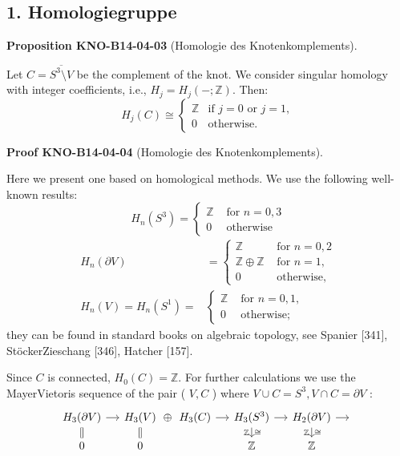 \documentclass[10pt, letterpaper]{article}
\newcommand{\CustomHeading}[3]{%
  \par\medskip\noindent%
  \textbf{#1 #2} \textnormal{(#3)}.\enskip%
}
\newenvironment{PROP}[2]{\CustomHeading{Proposition}{#1}{#2}}{}
\newenvironment{PROOF}[2]{\CustomHeading{Proof}{#1}{#2}}{}
\begin{document}
\subsection{1. Homologiegruppe}

\begin{PROP}{KNO-B14-04-03}{Homologie des Knotenkomplements}
Let \( C = \overline{S^3 \setminus V} \) be the complement of the knot. We consider singular homology with integer coefficients, i.e., \( H_j = H_j(-; \mathbb{Z}) \). Then:
\[
H_j(C) \cong
\begin{cases}
\mathbb{Z} & \text{if } j = 0 \text{ or } j = 1, \\
0 & \text{otherwise}.
\end{cases}
\]
\end{PROP}

\begin{PROOF}{KNO-B14-04-04}{Homologie des Knotenkomplements}
Here we present one based on homological methods. We use the following well-known results:
$$
H_{n}\left(S^{3}\right)= \begin{cases}\mathbb{Z} & \text { for } n=0,3 \\ 0 & \text { otherwise }\end{cases}
$$
$$
\begin{aligned}
H_{n}(\partial V) & = \begin{cases}\mathbb{Z} & \text { for } n=0,2 \\
\mathbb{Z} \oplus \mathbb{Z} & \text { for } n=1, \\
0 & \text { otherwise, }\end{cases} \\
H_{n}(V)=H_{n}\left(S^{1}\right)= & \begin{cases}\mathbb{Z} & \text { for } n=0,1, \\
0 & \text { otherwise; }\end{cases}
\end{aligned}
$$
they can be found in standard books on algebraic topology, see Spanier [341], StöckerZieschang [346], Hatcher [157].

Since $C$ is connected, $H_{0}(C)=\mathbb{Z}$. For further calculations we use the MayerVietoris sequence of the pair ( $V, C$ ) where $V \cup C=S^{3}, V \cap C=\partial V$ :
\[
\begin{tikzcd}[row sep=small, column sep=small]
H_3(\partial V) \arrow[r] \arrow[d, equal] 
  & H_3(V) \arrow[r, phantom, "\oplus"] \arrow[d, equal] 
  & H_3(C) \arrow[r] 
  & H_3(S^3) \arrow[r] \arrow[d, "\cong", "\mathbb{Z}"']
  & H_2(\partial V) \arrow[r] \arrow[d, "\cong", "\mathbb{Z}"'] 
  & {} \\
0 & 0 & {} & \mathbb{Z} & \mathbb{Z} & {}
\end{tikzcd}
\]


\end{PROOF}
\end{document}
